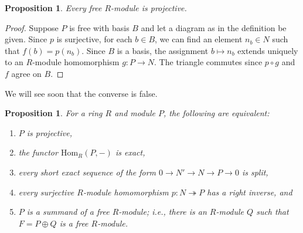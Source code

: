 \documentclass{amsart}[12pt]
\newcommand{\Hom}{\mathrm{Hom}}
\newcommand{\onto}{\twoheadrightarrow}
\numberwithin{equation}{section}
\theoremstyle{plain} %
\newtheorem{prop}[equation]{Proposition}
\theoremstyle{definition}
\theoremstyle{remark}
\begin{document}
\begin{prop}
\label{prop:freeimpliesproj}
 Every free $R$-module is projective.
\end{prop}

\begin{proof} Suppose $P$ is free with basis $B$ and let a diagram as in the definition be given. Since $p$ is surjective, for each $b \in B$, we can find an element $n_b \in N$
such that $f(b) = p(n_b)$. Since $B$ is a basis, the assignment $b \mapsto n_b$ extends uniquely to an $R$-module homomorphism $g: P \to N$. 
The triangle commutes since $p \circ g$ and $f$ agree on $B$. 
\end{proof}

We will see soon that the converse is false.

\begin{prop} \label{prop1111}
For a ring $R$ and module $P$, the following are equivalent:
\begin{enumerate}
\item $P$ is projective,
\item the functor $\Hom_R(P, -)$ is exact,
\item every short exact sequence of the form $0 \to N' \to N \to P \to 0$ is split,
\item every surjective $R$-module homomorphism $p: N \onto P$ has a right inverse, and
\item $P$ is a summand of a free $R$-module; i.e., there is an $R$-module $Q$ such that $F=P \oplus Q$ is a free $R$-module.
\end{enumerate}
\end{prop}
\end{document}

